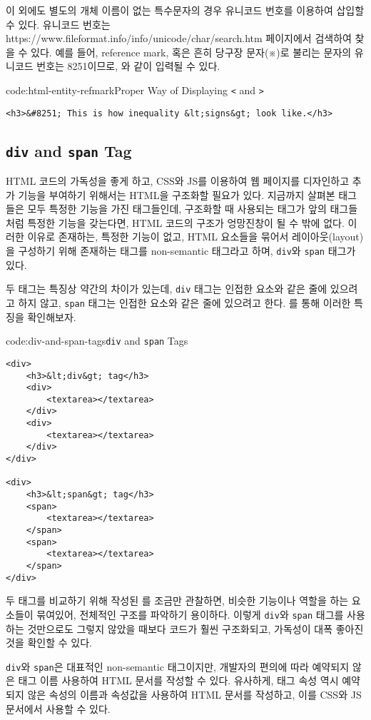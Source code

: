이 외에도 별도의 개체 이름이 없는 특수문자의 경우 유니코드 번호를 이용하여 삽입할 수 있다. 유니코드 번호는 https://www.fileformat.info/info/unicode/char/search.htm 페이지에서 검색하여 찾을 수 있다. 예를 들어, reference mark, 혹은 흔히 당구장 문자(※)로 불리는 문자의 유니코드 번호는 8251이므로, 와 같이 입력될 수 있다.

\begin{codeenv}{code:html-entity-refmark}{Proper Way of Displaying \texttt{<} and \texttt{>}}\begin{verbatim}
<h3>&#8251; This is how inequality &lt;signs&gt; look like.</h3>
\end{verbatim}
\end{codeenv}

\subsection*{\texttt{div} and \texttt{span} Tag}
HTML 코드의 가독성을 좋게 하고, CSS와 JS를 이용하여 웹 페이지를 디자인하고 추가 기능을 부여하기 위해서는 HTML을 구조화할 필요가 있다. 지금까지 살펴본 태그들은 모두 특정한 기능을 가진 태그들인데, 구조화할 때 사용되는 태그가 앞의 태그들처럼 특정한 기능을 갖는다면, HTML 코드의 구조가 엉망진창이 될 수 밖에 없다. 이러한 이유로 존재하는, 특정한 기능이 없고, HTML 요소들을 묶어서 레이아웃(layout)을 구성하기 위해 존재하는 태그를 non-semantic 태그라고 하며, \texttt{div}와 \texttt{span} 태그가 있다. 

두 태그는 특징상 약간의 차이가 있는데, \texttt{div} 태그는 인접한 요소와 같은 줄에 있으려고 하지 않고, \texttt{span} 태그는 인접한 요소와 같은 줄에 있으려고 한다. 를 통해 이러한 특징을 확인해보자.

\begin{codeenv}{code:div-and-span-tags}{\texttt{div} and \texttt{span} Tags}\begin{verbatim}
<div>
    <h3>&lt;div&gt; tag</h3>
    <div>
        <textarea></textarea>
    </div>
    <div>
        <textarea></textarea>
    </div>
</div>

<div>
    <h3>&lt;span&gt; tag</h3>
    <span>
        <textarea></textarea>
    </span>
    <span>
        <textarea></textarea>
    </span>
</div>
\end{verbatim}
\end{codeenv}

두 태그를 비교하기 위해 작성된 를 조금만 관찰하면, 비슷한 기능이나 역할을 하는 요소들이 묶여있어, 전체적인 구조를 파악하기 용이하다. 이렇게 \texttt{div}와 \texttt{span} 태그를 사용하는 것만으로도 그렇지 않았을 때보다 코드가 훨씬 구조화되고, 가독성이 대폭 좋아진 것을 확인할 수 있다. 

\texttt{div}와 \texttt{span}은 대표적인 non-semantic 태그이지만, 개발자의 편의에 따라 예약되지 않은 태그 이름 사용하여 HTML 문서를 작성할 수 있다. 유사하게, 태그 속성 역시 예약되지 않은 속성의 이름과 속성값을 사용하여 HTML 문서를 작성하고, 이를 CSS와 JS 문서에서 사용할 수 있다.
